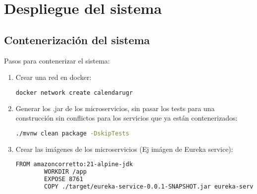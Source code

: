 \chapter{Despliegue del sistema}\label{cap:despliegue}

\section{Contenerización del sistema}

Pasos para contenerizar el sistema:

\begin{enumerate}
    \item Crear una red en docker:
    \begin{lstlisting}[language=bash]
        docker network create calendarugr
    \end{lstlisting}
    \item Generar los .jar de los microservicios, sin pasar los tests para una construcción sin conflictos para los servicios que ya están contenerizados:
    \begin{lstlisting}[language=bash]
        ./mvnw clean package -DskipTests
    \end{lstlisting}
    \item Crear las imágenes de los microservicios (Ej imágen de Eureka service):
    \begin{lstlisting}[language=bash]
        FROM amazoncorretto:21-alpine-jdk
        WORKDIR /app
        EXPOSE 8761
        COPY ./target/eureka-service-0.0.1-SNAPSHOT.jar eureka-service.jar


\end{lstlisting}
\end{enumerate}
